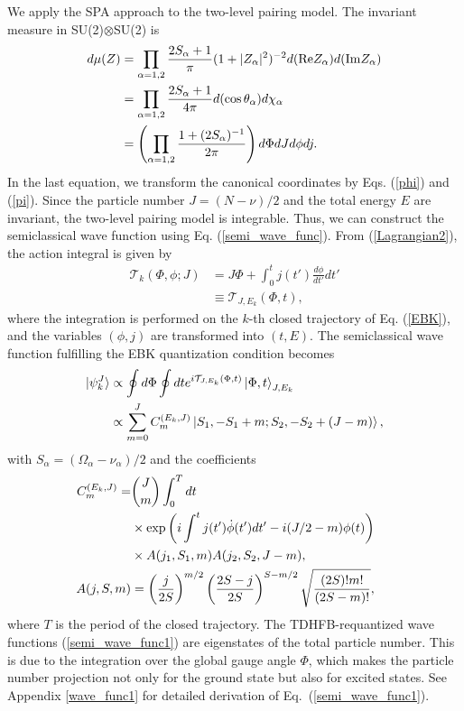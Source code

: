 \documentclass[11pt]{book} %
\begin{document}
We apply the SPA approach to the two-level pairing model.
The invariant measure in SU(2)$\otimes$SU(2) is 
\begin{align}
d\mu(Z) &= \prod_{\alpha=1,2} \frac{2S_{\alpha}+1}{\pi}(1+|Z_{\alpha}|^2)^{-2}d({\rm Re}Z_{\alpha})d({\rm Im}Z_{\alpha}) \nonumber \\
  &= \prod_{\alpha=1,2} \frac{2S_{\alpha}+1}{4\pi}d(\cos{\theta_{\alpha}})d\chi_{\alpha} \nonumber \\
	&= \left(\prod_{\alpha=1,2} \frac{1+(2S_{\alpha})^{-1}}{2\pi}\right)
             d\Phi dJ d\phi dj .
\end{align}
In the last equation, we transform the canonical coordinates
by Eqs. (\ref{phi}) and (\ref{pi}).
Since the particle number $J=(N-\nu)/2$ and the total energy $E$ are invariant,
the two-level pairing model is integrable.
Thus, we can construct the semiclassical wave function using
Eq. (\ref{semi_wave_func}).
From (\ref{Lagrangian2}), the action integral is given by
\begin{align}
	\mathcal{T}_k(\Phi,\phi;J)
	&= J\Phi + \int^t_0
	j(t') \frac{d\phi}{dt'} dt' \nonumber \\
	&\equiv \mathcal{T}_{J,E_k}(\Phi,t) ,
\end{align}
where the integration is performed on the $k$-th
closed trajectory of Eq. (\ref{EBK}), and
the variables $(\phi,j)$ are transformed into $(t,E)$.
The semiclassical wave function fulfilling the EBK quantization condition
becomes
\begin{align}
	\ket{\psi_k^J} &\propto \oint d\Phi \oint dt
	e^{i\mathcal{T}_{J,E_k}(\Phi, t)}
	\ket{\Phi,t}_{J,E_k} \label{semi_wave_func0} \\
  &\propto \sum_{m=0}^{J}C_m^{(E_k,J)}\ket{S_1,-S_1+m;S_2,-S_2+(J-m)} ,
	\label{semi_wave_func1}
\end{align}
with $S_{\alpha}=(\Omega_{\alpha}-\nu_{\alpha})/2$ and the coefficients
\begin{align}
  C_m^{(E_k,J)} =& \binom{J}{m}\int_0^T dt \nonumber \\
 &\times \exp{\left( i\int^t j(t') \dot{\phi}(t') dt'-i(J/2-m)\phi(t) \right)} \nonumber \\ 
 &\times A(j_1,S_1,m)A(j_2,S_2,J-m) ,\\
  A(j,S,m) &= \left(\frac{j}{2S}\right)^{m/2}\left(\frac{2S-j}{2S}\right)^{S-m/2}\sqrt{\frac{(2S)!m!}{(2S-m)!}}, \hspace{5mm} \nonumber
\end{align}
where $T$ is the period of the closed trajectory.
The TDHFB-requantized wave functions (\ref{semi_wave_func1}) are
eigenstates of the total particle number.
This is due to the integration over the global gauge angle $\Phi$,
which makes the particle number projection not only for the ground state
but also for excited states.
See Appendix \ref{wave_func1} for detailed derivation of Eq.~(\ref{semi_wave_func1}). 
\end{document}

